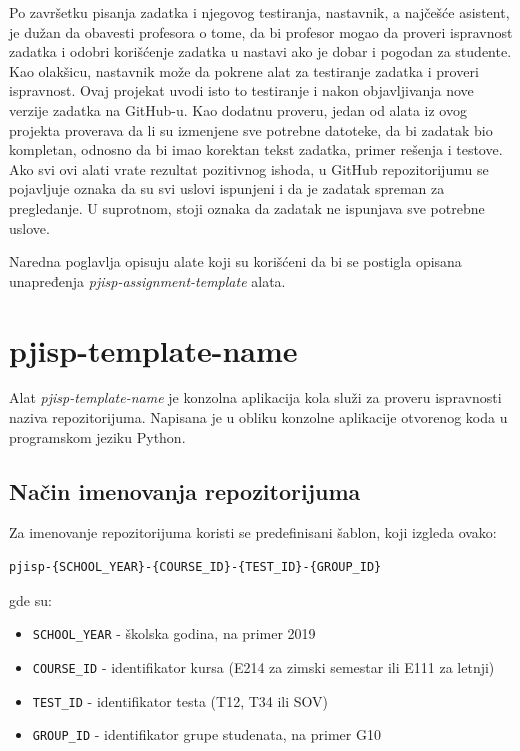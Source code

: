 \documentclass[12pt]{report}
\begin{document}
Po završetku pisanja zadatka i njegovog testiranja, nastavnik, a najčešće asistent, je dužan da obavesti profesora o tome, da bi profesor mogao da proveri ispravnost zadatka i odobri korišćenje zadatka u nastavi ako je dobar i pogodan za studente. Kao olakšicu, nastavnik može da pokrene alat za testiranje zadatka i proveri ispravnost. Ovaj projekat uvodi isto to testiranje i nakon objavljivanja nove verzije zadatka na GitHub-u. Kao dodatnu proveru, jedan od alata iz ovog projekta proverava da li su izmenjene sve potrebne datoteke, da bi zadatak bio kompletan, odnosno da bi imao korektan tekst zadatka, primer rešenja i testove. Ako svi ovi alati vrate rezultat pozitivnog ishoda, u GitHub repozitorijumu se pojavljuje oznaka da su svi uslovi ispunjeni i da je zadatak spreman za pregledanje. U suprotnom, stoji oznaka da zadatak ne ispunjava sve potrebne uslove.

Naredna poglavlja opisuju alate koji su korišćeni da bi se postigla opisana unapređenja \textit{pjisp-assignment-template} alata.

\section{pjisp-template-name}
Alat \textit{pjisp-template-name} \cite{pjisp-template-name} je konzolna aplikacija kola služi za proveru ispravnosti naziva repozitorijuma. Napisana je u obliku konzolne aplikacije otvorenog koda u programskom jeziku Python.

\subsection{Način imenovanja repozitorijuma}
Za imenovanje repozitorijuma koristi se predefinisani šablon, koji izgleda ovako:

\begin{verbatim}
pjisp-{SCHOOL_YEAR}-{COURSE_ID}-{TEST_ID}-{GROUP_ID}
\end{verbatim}

gde su:

\begin{itemize}
    \item \texttt{{SCHOOL\_YEAR}} - školska godina, na primer 2019
    \item \texttt{{COURSE\_ID}} - identifikator kursa (E214 za zimski semestar ili E111 za letnji)
    \item \texttt{{TEST\_ID}} - identifikator testa (T12, T34 ili SOV)
    \item \texttt{{GROUP\_ID}} - identifikator grupe studenata, na primer G10
\end{itemize}
\end{document}
